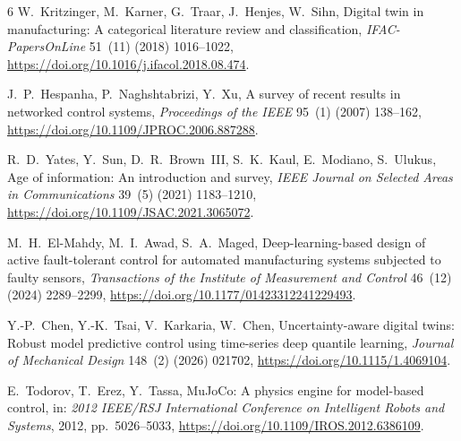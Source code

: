 \begin{thebibliography}{6}
W.~Kritzinger, M.~Karner, G.~Traar, J.~Henjes, W.~Sihn,
Digital twin in manufacturing: A categorical literature review and classification,
\emph{IFAC-PapersOnLine} 51~(11) (2018) 1016--1022,
\url{https://doi.org/10.1016/j.ifacol.2018.08.474}.

J.~P.~Hespanha, P.~Naghshtabrizi, Y.~Xu,
A survey of recent results in networked control systems,
\emph{Proceedings of the IEEE} 95~(1) (2007) 138--162,
\url{https://doi.org/10.1109/JPROC.2006.887288}.

R.~D.~Yates, Y.~Sun, D.~R.~Brown~III, S.~K.~Kaul, E.~Modiano, S.~Ulukus,
Age of information: An introduction and survey,
\emph{IEEE Journal on Selected Areas in Communications} 39~(5) (2021) 1183--1210,
\url{https://doi.org/10.1109/JSAC.2021.3065072}.

M.~H.~El-Mahdy, M.~I.~Awad, S.~A.~Maged,
Deep-learning-based design of active fault-tolerant control for automated manufacturing systems subjected to faulty sensors,
\emph{Transactions of the Institute of Measurement and Control} 46~(12) (2024) 2289--2299,
\url{https://doi.org/10.1177/01423312241229493}.

Y.-P.~Chen, Y.-K.~Tsai, V.~Karkaria, W.~Chen,
Uncertainty-aware digital twins: Robust model predictive control using time-series deep quantile learning,
\emph{Journal of Mechanical Design} 148~(2) (2026) 021702,
\url{https://doi.org/10.1115/1.4069104}.

E.~Todorov, T.~Erez, Y.~Tassa,
MuJoCo: A physics engine for model-based control,
in: \emph{2012 IEEE/RSJ International Conference on Intelligent Robots and Systems},
2012, pp.~5026--5033,
\url{https://doi.org/10.1109/IROS.2012.6386109}.
\end{thebibliography}
